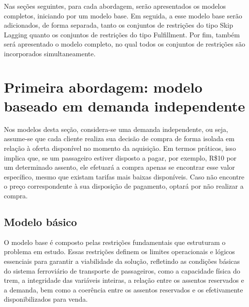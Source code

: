 

Nas seções seguintes, para cada abordagem, serão apresentados os modelos completos, iniciando por um modelo base. Em seguida, a esse modelo base serão adicionados, de forma separada, tanto os conjuntos de restrições do tipo Skip Lagging quanto os conjuntos de restrições do tipo Fulfillment. Por fim, também será apresentado o modelo completo, no qual todos os conjuntos de restrições são incorporados simultaneamente.

\section{Primeira abordagem: modelo baseado em demanda independente}\label{sec:modelo1}

Nos modelos desta seção, considera-se uma demanda independente, ou seja, assume-se que cada cliente realiza sua decisão de compra de forma isolada em relação à oferta disponível no momento da aquisição. Em termos práticos, isso implica que, se um passageiro estiver disposto a pagar, por exemplo, R\$10 por um determinado assento, ele efetuará a compra apenas se encontrar esse valor específico, mesmo que existam tarifas mais baixas disponíveis. Caso não encontre o preço correspondente à sua disposição de pagamento, optará por não realizar a compra.

\subsection{Modelo básico}
O modelo base é composto pelas restrições fundamentais que estruturam o problema em estudo. Essas restrições definem os limites operacionais e lógicos essenciais para garantir a viabilidade da solução, refletindo as condições básicas do sistema ferroviário de transporte de passageiros, como a capacidade física do trem, a integridade das variáveis inteiras, a relação entre os assentos reservados e a demanda, bem como a coerência entre os assentos reservados e os efetivamente disponibilizados para venda.

